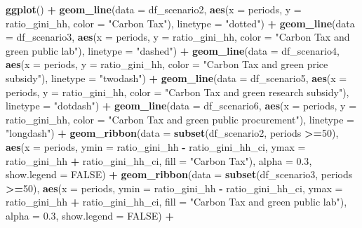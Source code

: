 \documentclass[
]{article}
\newenvironment{Shaded}{\begin{snugshade}}{\end{snugshade}}
\newcommand{\AttributeTok}[1]{\textcolor[rgb]{0.13,0.29,0.53}{#1}}
\newcommand{\ConstantTok}[1]{\textcolor[rgb]{0.56,0.35,0.01}{#1}}
\newcommand{\DecValTok}[1]{\textcolor[rgb]{0.00,0.00,0.81}{#1}}
\newcommand{\FloatTok}[1]{\textcolor[rgb]{0.00,0.00,0.81}{#1}}
\newcommand{\FunctionTok}[1]{\textcolor[rgb]{0.13,0.29,0.53}{\textbf{#1}}}
\newcommand{\NormalTok}[1]{#1}
\newcommand{\SpecialCharTok}[1]{\textcolor[rgb]{0.81,0.36,0.00}{\textbf{#1}}}
\newcommand{\StringTok}[1]{\textcolor[rgb]{0.31,0.60,0.02}{#1}}
\begin{document}
\begin{Shaded}
\begin{Highlighting}[]
\FunctionTok{ggplot}\NormalTok{() }\SpecialCharTok{+}
  \FunctionTok{geom\_line}\NormalTok{(}\AttributeTok{data =}\NormalTok{ df\_scenario2, }\FunctionTok{aes}\NormalTok{(}\AttributeTok{x =}\NormalTok{ periods, }\AttributeTok{y =}\NormalTok{ ratio\_gini\_hh, }\AttributeTok{color =} \StringTok{"Carbon Tax"}\NormalTok{), }\AttributeTok{linetype =} \StringTok{"dotted"}\NormalTok{) }\SpecialCharTok{+}
  \FunctionTok{geom\_line}\NormalTok{(}\AttributeTok{data =}\NormalTok{ df\_scenario3, }\FunctionTok{aes}\NormalTok{(}\AttributeTok{x =}\NormalTok{ periods, }\AttributeTok{y =}\NormalTok{ ratio\_gini\_hh, }\AttributeTok{color =} \StringTok{"Carbon Tax and green public lab"}\NormalTok{), }\AttributeTok{linetype =} \StringTok{"dashed"}\NormalTok{) }\SpecialCharTok{+}
  \FunctionTok{geom\_line}\NormalTok{(}\AttributeTok{data =}\NormalTok{ df\_scenario4, }\FunctionTok{aes}\NormalTok{(}\AttributeTok{x =}\NormalTok{ periods, }\AttributeTok{y =}\NormalTok{ ratio\_gini\_hh, }\AttributeTok{color =} \StringTok{"Carbon Tax and green price subsidy"}\NormalTok{), }\AttributeTok{linetype =} \StringTok{"twodash"}\NormalTok{) }\SpecialCharTok{+}
  \FunctionTok{geom\_line}\NormalTok{(}\AttributeTok{data =}\NormalTok{ df\_scenario5, }\FunctionTok{aes}\NormalTok{(}\AttributeTok{x =}\NormalTok{ periods, }\AttributeTok{y =}\NormalTok{ ratio\_gini\_hh, }\AttributeTok{color =} \StringTok{"Carbon Tax and green research subsidy"}\NormalTok{), }\AttributeTok{linetype =} \StringTok{"dotdash"}\NormalTok{) }\SpecialCharTok{+}
  \FunctionTok{geom\_line}\NormalTok{(}\AttributeTok{data =}\NormalTok{ df\_scenario6, }\FunctionTok{aes}\NormalTok{(}\AttributeTok{x =}\NormalTok{ periods, }\AttributeTok{y =}\NormalTok{ ratio\_gini\_hh, }\AttributeTok{color =} \StringTok{"Carbon Tax and green public procurement"}\NormalTok{), }\AttributeTok{linetype =} \StringTok{"longdash"}\NormalTok{) }\SpecialCharTok{+}
  \FunctionTok{geom\_ribbon}\NormalTok{(}\AttributeTok{data =} \FunctionTok{subset}\NormalTok{(df\_scenario2, periods }\SpecialCharTok{\textgreater{}=}\DecValTok{50}\NormalTok{), }\FunctionTok{aes}\NormalTok{(}\AttributeTok{x =}\NormalTok{ periods, }\AttributeTok{ymin =}\NormalTok{ ratio\_gini\_hh }\SpecialCharTok{{-}}\NormalTok{ ratio\_gini\_hh\_ci, }\AttributeTok{ymax =}\NormalTok{ ratio\_gini\_hh }\SpecialCharTok{+}\NormalTok{ ratio\_gini\_hh\_ci, }\AttributeTok{fill =} \StringTok{"Carbon Tax"}\NormalTok{), }\AttributeTok{alpha =} \FloatTok{0.3}\NormalTok{, }\AttributeTok{show.legend =} \ConstantTok{FALSE}\NormalTok{) }\SpecialCharTok{+}
  \FunctionTok{geom\_ribbon}\NormalTok{(}\AttributeTok{data =} \FunctionTok{subset}\NormalTok{(df\_scenario3, periods }\SpecialCharTok{\textgreater{}=}\DecValTok{50}\NormalTok{), }\FunctionTok{aes}\NormalTok{(}\AttributeTok{x =}\NormalTok{ periods, }\AttributeTok{ymin =}\NormalTok{ ratio\_gini\_hh }\SpecialCharTok{{-}}\NormalTok{ ratio\_gini\_hh\_ci, }\AttributeTok{ymax =}\NormalTok{ ratio\_gini\_hh }\SpecialCharTok{+}\NormalTok{ ratio\_gini\_hh\_ci, }\AttributeTok{fill =} \StringTok{"Carbon Tax and green public lab"}\NormalTok{), }\AttributeTok{alpha =} \FloatTok{0.3}\NormalTok{, }\AttributeTok{show.legend =} \ConstantTok{FALSE}\NormalTok{) }\SpecialCharTok{+}

\end{Highlighting}
\end{Shaded}
\end{document}
